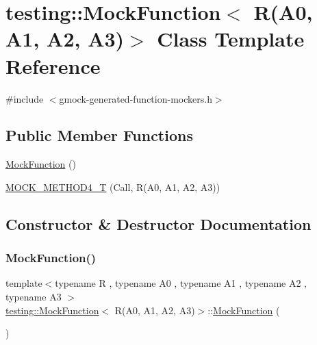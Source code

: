 \hypertarget{classtesting_1_1_mock_function_3_01_r_07_a0_00_01_a1_00_01_a2_00_01_a3_08_4}{}\section{testing\+:\+:Mock\+Function$<$ R(A0, A1, A2, A3)$>$ Class Template Reference}
\label{classtesting_1_1_mock_function_3_01_r_07_a0_00_01_a1_00_01_a2_00_01_a3_08_4}


{\ttfamily \#include $<$gmock-\/generated-\/function-\/mockers.\+h$>$}

\subsection*{Public Member Functions}
\begin{DoxyCompactItemize}
\item 
\hyperlink{classtesting_1_1_mock_function_3_01_r_07_a0_00_01_a1_00_01_a2_00_01_a3_08_4_abf2185b2c08c575374074520778f574a}{Mock\+Function} ()
\item 
\hyperlink{classtesting_1_1_mock_function_3_01_r_07_a0_00_01_a1_00_01_a2_00_01_a3_08_4_ad158c25a1b33cb53bae3f0eb9df0d59c}{M\+O\+C\+K\+\_\+\+M\+E\+T\+H\+O\+D4\+\_\+T} (Call, R(A0, A1, A2, A3))
\end{DoxyCompactItemize}


\subsection{Constructor \& Destructor Documentation}
\mbox{\label{classtesting_1_1_mock_function_3_01_r_07_a0_00_01_a1_00_01_a2_00_01_a3_08_4_abf2185b2c08c575374074520778f574a}} 
\subsubsection{\texorpdfstring{Mock\+Function()}{MockFunction()}}
{\footnotesize\ttfamily template$<$typename R , typename A0 , typename A1 , typename A2 , typename A3 $>$ \\
\hyperlink{classtesting_1_1_mock_function}{testing\+::\+Mock\+Function}$<$ R(A0, A1, A2, A3)$>$\+::\hyperlink{classtesting_1_1_mock_function}{Mock\+Function} (\begin{DoxyParamCaption}{ }\end{DoxyParamCaption})\hspace{0.3cm}{\ttfamily [inline]}}



